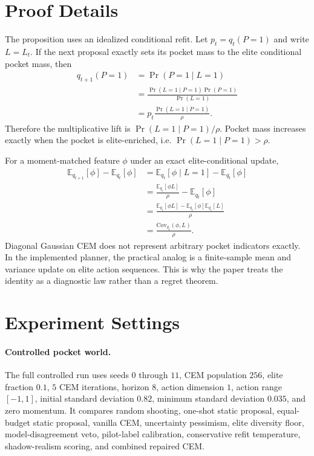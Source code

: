\section{Proof Details}
\label{app:proof}

The proposition uses an idealized conditional refit. Let $p_t=q_t(P=1)$ and write $L=L_t$. If the next proposal exactly sets its pocket mass to the elite conditional pocket mass, then
\begin{align}
q_{t+1}(P=1)
&=\Pr(P=1\mid L=1)\\
&=\frac{\Pr(L=1\mid P=1)\Pr(P=1)}{\Pr(L=1)}\\
&=p_t\frac{\Pr(L=1\mid P=1)}{\rho}.
\end{align}
Therefore the multiplicative lift is $\Pr(L=1\mid P=1)/\rho$. Pocket mass increases exactly when the pocket is elite-enriched, i.e. $\Pr(L=1\mid P=1)>\rho$.

For a moment-matched feature $\phi$ under an exact elite-conditional update,
\begin{align}
\mathbb{E}_{q_{t+1}}[\phi]-\mathbb{E}_{q_t}[\phi]
&=\mathbb{E}_{q_t}[\phi\mid L=1]-\mathbb{E}_{q_t}[\phi]\\
&=\frac{\mathbb{E}_{q_t}[\phi L]}{\rho}-\mathbb{E}_{q_t}[\phi]\\
&=\frac{\mathbb{E}_{q_t}[\phi L]-\mathbb{E}_{q_t}[\phi]\mathbb{E}_{q_t}[L]}{\rho}\\
&=\frac{\mathrm{Cov}_{q_t}(\phi,L)}{\rho}.
\end{align}
Diagonal Gaussian CEM does not represent arbitrary pocket indicators exactly. In the implemented planner, the practical analog is a finite-sample mean and variance update on elite action sequences. This is why the paper treats the identity as a diagnostic law rather than a regret theorem.

\section{Experiment Settings}
\label{app:settings}

\paragraph{Controlled pocket world.}
The full controlled run uses seeds $0$ through $11$, CEM population $256$, elite fraction $0.1$, $5$ CEM iterations, horizon $8$, action dimension $1$, action range $[-1,1]$, initial standard deviation $0.82$, minimum standard deviation $0.035$, and zero momentum. It compares random shooting, one-shot static proposal, equal-budget static proposal, vanilla CEM, uncertainty pessimism, elite diversity floor, model-disagreement veto, pilot-label calibration, conservative refit temperature, shadow-realism scoring, and combined repaired CEM.

